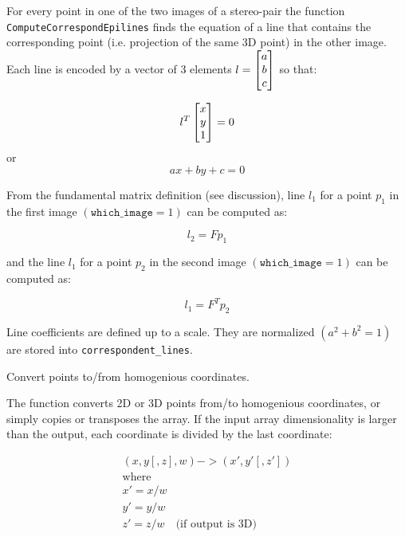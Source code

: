 For every point in one of the two images of a stereo-pair the function
\texttt{ComputeCorrespondEpilines} finds the equation of a line that
contains the corresponding point (i.e. projection of the same 3D
point) in the other image. Each line is encoded by a vector of 3
elements $l = \begin{bmatrix} a\\ b\\ c \end{bmatrix}$ so that:

\[ l^T \begin{bmatrix} x\\ y\\ 1 \end{bmatrix} = 0 \]
or
\[ a x + b y + c = 0 \]

From the fundamental matrix definition (see 
discussion), line $l_1$ for a point $p_1$ in the first image
$(\texttt{which\_image} =1)$ can be computed as:

\[ l_2 = F p_1 \]

and the line $l_1$ for a point $p_2$ in the second image $(\texttt{which\_image} =1)$ can be computed as:

\[ l_1 = F^T p_2 \]

Line coefficients are defined up to a scale. They are normalized $(a^2+b^2=1)$ are stored into \texttt{correspondent\_lines}.

\ifC

Convert points to/from homogenious coordinates.


\begin{description}
\end{description}

The function converts 2D or 3D points from/to homogenious coordinates, or simply copies or transposes the array. If the input array dimensionality is larger than the output, each coordinate is divided by the last coordinate:

\[
\begin{array}{l}
(x,y[,z],w) -> (x',y'[,z'])\\
\text{where} \\
x' = x/w \\
y' = y/w \\
z' = z/w \quad \text{(if output is 3D)}
\end{array}
\]


